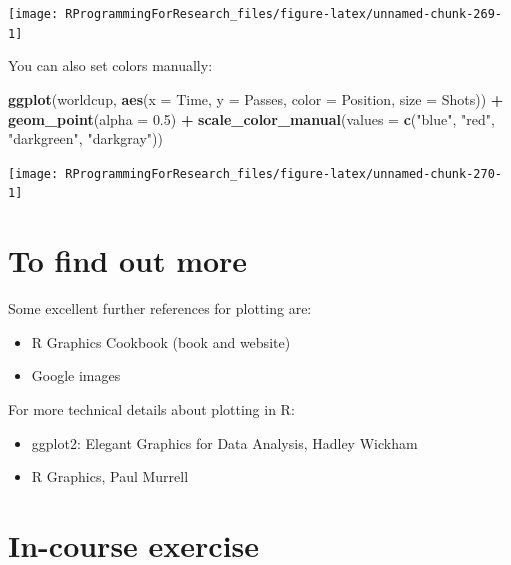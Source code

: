 \documentclass[]{book}
\makeatletter
\newenvironment{Shaded}{\begin{snugshade}}{\end{snugshade}}
\newcommand{\KeywordTok}[1]{\textcolor[rgb]{0.13,0.29,0.53}{\textbf{#1}}}
\newcommand{\DataTypeTok}[1]{\textcolor[rgb]{0.13,0.29,0.53}{#1}}
\newcommand{\FloatTok}[1]{\textcolor[rgb]{0.00,0.00,0.81}{#1}}
\newcommand{\StringTok}[1]{\textcolor[rgb]{0.31,0.60,0.02}{#1}}
\newcommand{\OperatorTok}[1]{\textcolor[rgb]{0.81,0.36,0.00}{\textbf{#1}}}
\newcommand{\NormalTok}[1]{#1}
\providecommand{\tightlist}{%
  \setlength{\itemsep}{0pt}\setlength{\parskip}{0pt}}
\newenvironment{kframe}{%
\medskip{}
\setlength{\fboxsep}{.8em}
 \def\at@end@of@kframe{}%
 \ifinner\ifhmode%
  \def\at@end@of@kframe{\end{minipage}}%
  \begin{minipage}{\columnwidth}%
 \fi\fi%
 \def\FrameCommand##1{\hskip\@totalleftmargin \hskip-\fboxsep
 \colorbox{shadecolor}{##1}\hskip-\fboxsep
     \hskip-\linewidth \hskip-\@totalleftmargin \hskip\columnwidth}%
 \MakeFramed {\advance\hsize-\width
   \@totalleftmargin\z@ \linewidth\hsize
   \@setminipage}}%
 {\par\unskip\endMakeFramed%
 \at@end@of@kframe}
\renewenvironment{Shaded}{\begin{kframe}}{\end{kframe}}
\theoremstyle{definition}
\theoremstyle{definition}
\theoremstyle{definition}
\theoremstyle{remark}
\makeatother
\begin{document}
\begin{center}\texttt{[image: RProgrammingForResearch\_files/figure-latex/unnamed-chunk-269-1]} \end{center}

You can also set colors manually:

\begin{Shaded}
\begin{Highlighting}[]
\KeywordTok{ggplot}\NormalTok{(worldcup, }\KeywordTok{aes}\NormalTok{(}\DataTypeTok{x =}\NormalTok{ Time, }\DataTypeTok{y =}\NormalTok{ Passes,}
                     \DataTypeTok{color =}\NormalTok{ Position, }\DataTypeTok{size =}\NormalTok{ Shots)) }\OperatorTok{+}\StringTok{ }
\StringTok{  }\KeywordTok{geom_point}\NormalTok{(}\DataTypeTok{alpha =} \FloatTok{0.5}\NormalTok{) }\OperatorTok{+}\StringTok{ }
\StringTok{  }\KeywordTok{scale_color_manual}\NormalTok{(}\DataTypeTok{values =} \KeywordTok{c}\NormalTok{(}\StringTok{"blue"}\NormalTok{, }\StringTok{"red"}\NormalTok{, }
                                \StringTok{"darkgreen"}\NormalTok{, }\StringTok{"darkgray"}\NormalTok{))}
\end{Highlighting}
\end{Shaded}

\begin{center}\texttt{[image: RProgrammingForResearch\_files/figure-latex/unnamed-chunk-270-1]} \end{center}

\section{To find out more}\label{to-find-out-more}

Some excellent further references for plotting are:

\begin{itemize}
\tightlist
\item
  R Graphics Cookbook (book and website)
\item
  Google images
\end{itemize}

For more technical details about plotting in R:

\begin{itemize}
\tightlist
\item
  ggplot2: Elegant Graphics for Data Analysis, Hadley Wickham
\item
  R Graphics, Paul Murrell
\end{itemize}

\section{In-course exercise}\label{in-course-exercise-3}
\end{document}
